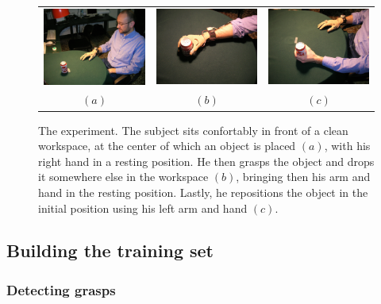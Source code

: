 \begin{figure}[htbp]
  \begin{center}
    \begin{tabular}{ccc}
      \includegraphics[width=0.3\linewidth]{exp1.eps} &
      \includegraphics[width=0.3\linewidth]{exp2.eps}  &
      \includegraphics[width=0.3\linewidth]{exp3.eps} \\
      $(a)$ & $(b)$ & $(c)$
    \end{tabular}
    \caption{The experiment. The subject sits confortably in front of
    a clean workspace, at the center of which an object is placed
    $(a)$, with his right hand in a resting position. He then grasps
    the object and drops it somewhere else in the workspace $(b)$,
    bringing then his arm and hand in the resting position. Lastly, he
    repositions the object in the initial position using his left arm
    and hand $(c)$.}
    \label{fig:setup}
  \end{center}
\end{figure}

\subsection{Building the training set}

\subsubsection*{Detecting grasps}

